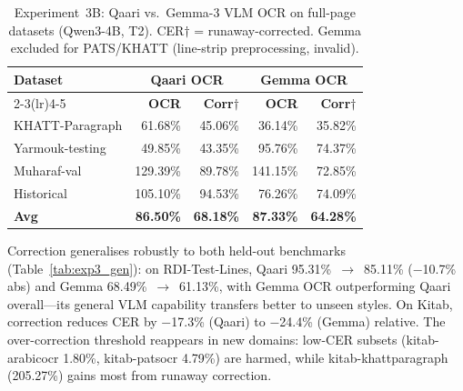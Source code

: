 \documentclass[conference]{IEEEtran}
\begin{document}
\begin{table}[t]
\caption{Experiment~3B: Qaari vs.\ Gemma-3 VLM OCR on full-page datasets
(Qwen3-4B, T2). CER$\dagger$ = runaway-corrected.
Gemma excluded for PATS/KHATT (line-strip preprocessing, invalid).}
\label{tab:exp3_ocr}
\begin{center}
\small
\begin{tabular}{lrrrr}
\toprule
\textbf{Dataset}
  & \multicolumn{2}{c}{\textbf{Qaari OCR}}
  & \multicolumn{2}{c}{\textbf{Gemma OCR}} \\
\cmidrule(lr){2-3}\cmidrule(lr){4-5}
& \textbf{OCR} & \textbf{Corr$\dagger$} & \textbf{OCR} & \textbf{Corr$\dagger$} \\
\midrule
KHATT-Paragraph  &  61.68\% & 45.06\% &  36.14\% & 35.82\% \\
Yarmouk-testing  &  49.85\% & 43.35\% &  95.76\% & 74.37\% \\
Muharaf-val      & 129.39\% & 89.78\% & 141.15\% & 72.85\% \\
Historical       & 105.10\% & 94.53\% &  76.26\% & 74.09\% \\
\midrule
\textbf{Avg} & \textbf{86.50\%} & \textbf{68.18\%} & \textbf{87.33\%} & \textbf{64.28\%} \\
\bottomrule
\end{tabular}
\end{center}
\end{table}

Correction generalises robustly to both held-out benchmarks
(Table~\ref{tab:exp3_gen}): on RDI-Test-Lines, Qaari 95.31\%~$\to$~85.11\%
($-$10.7\% abs) and Gemma 68.49\%~$\to$~61.13\%, with Gemma OCR outperforming
Qaari overall---its general VLM capability transfers better to unseen styles. On
Kitab, correction reduces CER by $-$17.3\% (Qaari) to $-$24.4\% (Gemma)
relative. The over-correction threshold reappears in new domains: low-CER
subsets (kitab-arabicocr 1.80\%, kitab-patsocr 4.79\%) are harmed, while
kitab-khattparagraph (205.27\%) gains most from runaway correction.
\end{document}
